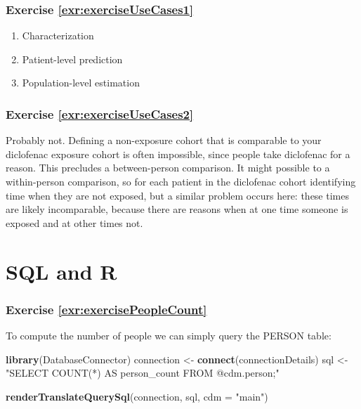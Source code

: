 \documentclass[11pt]{book}
\newenvironment{Shaded}{\begin{snugshade}}{\end{snugshade}}
\newcommand{\KeywordTok}[1]{\textcolor[rgb]{0.13,0.29,0.53}{\textbf{#1}}}
\newcommand{\DataTypeTok}[1]{\textcolor[rgb]{0.13,0.29,0.53}{#1}}
\newcommand{\StringTok}[1]{\textcolor[rgb]{0.31,0.60,0.02}{#1}}
\newcommand{\NormalTok}[1]{#1}
\theoremstyle{definition}
\theoremstyle{definition}
\theoremstyle{definition}
\theoremstyle{remark}
\begin{document}
\subsubsection*{Exercise
\ref{exr:exerciseUseCases1}}\label{exercise-refexrexerciseusecases1}

\begin{enumerate}
\def\labelenumi{\arabic{enumi}.}
\item
  Characterization
\item
  Patient-level prediction
\item
  Population-level estimation
\end{enumerate}

\subsubsection*{Exercise
\ref{exr:exerciseUseCases2}}\label{exercise-refexrexerciseusecases2}

Probably not. Defining a non-exposure cohort that is comparable to your
diclofenac exposure cohort is often impossible, since people take
diclofenac for a reason. This precludes a between-person comparison. It
might possible to a within-person comparison, so for each patient in the
diclofenac cohort identifying time when they are not exposed, but a
similar problem occurs here: these times are likely incomparable,
because there are reasons when at one time someone is exposed and at
other times not.

\section{SQL and R}\label{SqlAndRanswers}

\subsubsection*{Exercise
\ref{exr:exercisePeopleCount}}\label{exercise-refexrexercisepeoplecount}

To compute the number of people we can simply query the PERSON table:

\begin{Shaded}
\begin{Highlighting}[]
\KeywordTok{library}\NormalTok{(DatabaseConnector)}
\NormalTok{connection <-}\StringTok{ }\KeywordTok{connect}\NormalTok{(connectionDetails)}
\NormalTok{sql <-}\StringTok{ "SELECT COUNT(*) AS person_count}
\StringTok{FROM @cdm.person;"}

\KeywordTok{renderTranslateQuerySql}\NormalTok{(connection, sql, }\DataTypeTok{cdm =} \StringTok{"main"}\NormalTok{)}
\end{Highlighting}
\end{Shaded}
\end{document}
